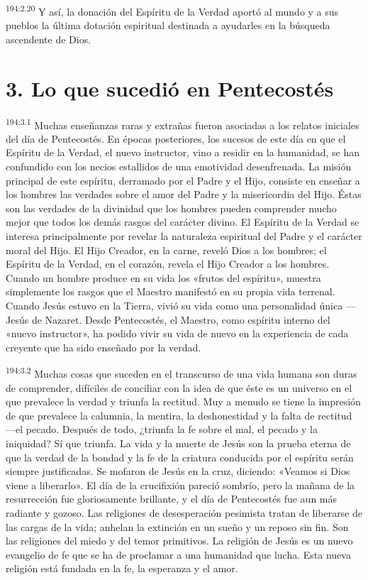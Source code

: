 \par 
\textsuperscript{194:2.20} Y así, la donación del Espíritu de la Verdad aportó al mundo y a sus pueblos la última dotación espiritual destinada a ayudarles en la búsqueda ascendente de Dios.

\section*{3. Lo que sucedió en Pentecostés}
\par 
\textsuperscript{194:3.1} Muchas enseñanzas raras y extrañas fueron asociadas a los relatos iniciales del día de Pentecostés. En épocas posteriores, los sucesos de este día en que el Espíritu de la Verdad, el nuevo instructor, vino a residir en la humanidad, se han confundido con los necios estallidos de una emotividad desenfrenada. La misión principal de este espíritu, derramado por el Padre y el Hijo, consiste en enseñar a los hombres las verdades sobre el amor del Padre y la misericordia del Hijo. Éstas son las verdades de la divinidad que los hombres pueden comprender mucho mejor que todos los demás rasgos del carácter divino. El Espíritu de la Verdad se interesa principalmente por revelar la naturaleza espiritual del Padre y el carácter moral del Hijo. El Hijo Creador, en la carne, reveló Dios a los hombres; el Espíritu de la Verdad, en el corazón, revela el Hijo Creador a los hombres. Cuando un hombre produce en su vida los «frutos del espíritu», muestra simplemente los rasgos que el Maestro manifestó en su propia vida terrenal. Cuando Jesús estuvo en la Tierra, vivió su vida como una personalidad única ---Jesús de Nazaret. Desde Pentecostés, el Maestro, como espíritu interno del «nuevo instructor», ha podido vivir su vida de nuevo en la experiencia de cada creyente que ha sido enseñado por la verdad.

\par 
\textsuperscript{194:3.2} Muchas cosas que suceden en el transcurso de una vida humana son duras de comprender, difíciles de conciliar con la idea de que éste es un universo en el que prevalece la verdad y triunfa la rectitud. Muy a menudo se tiene la impresión de que prevalece la calumnia, la mentira, la deshonestidad y la falta de rectitud ---el pecado. Después de todo, ¿triunfa la fe sobre el mal, el pecado y la iniquidad? Sí que triunfa. La vida y la muerte de Jesús son la prueba eterna de que la verdad de la bondad y la fe de la criatura conducida por el espíritu serán siempre justificadas. Se mofaron de Jesús en la cruz, diciendo: «Veamos si Dios viene a liberarlo». El día de la crucifixión pareció sombrío, pero la mañana de la resurrección fue gloriosamente brillante, y el día de Pentecostés fue aun más radiante y gozoso. Las religiones de desesperación pesimista tratan de liberarse de las cargas de la vida; anhelan la extinción en un sueño y un reposo sin fin. Son las religiones del miedo y del temor primitivos. La religión de Jesús es un nuevo evangelio de fe que se ha de proclamar a una humanidad que lucha. Esta nueva religión está fundada en la fe, la esperanza y el amor.

